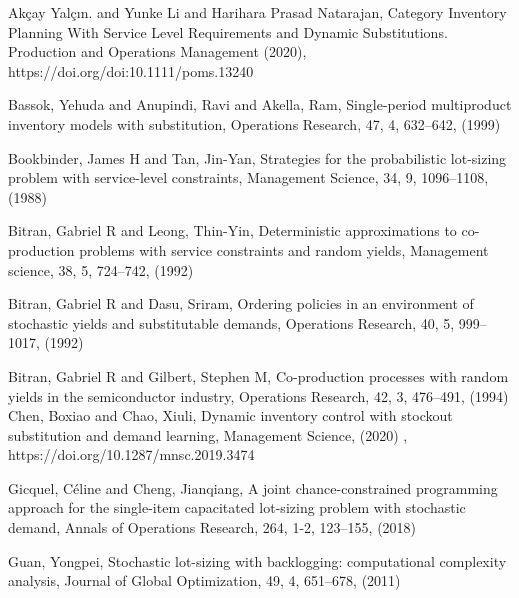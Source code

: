 \documentclass[10pt]{article}
\begin{document}
\begin{thebibliography}{99}







Akçay Yalçın. and Yunke Li and Harihara Prasad Natarajan, Category Inventory Planning With
Service Level Requirements and Dynamic Substitutions.
Production and Operations Management (2020), https://doi.org/doi:10.1111/poms.13240

Bassok, Yehuda and Anupindi, Ravi and Akella, Ram,
Single-period multiproduct inventory models with substitution, Operations Research, 47, 4, 632--642, (1999)
 

 Bookbinder, James H and Tan, Jin-Yan, Strategies for the probabilistic lot-sizing problem with service-level constraints, Management Science, 34, 9, 1096--1108,
 (1988)


Bitran, Gabriel R and Leong, Thin-Yin, Deterministic approximations to co-production problems with service constraints and random yields, Management science, 38, 5, 724--742, (1992)
  
  
Bitran, Gabriel R and Dasu, Sriram, Ordering policies in an environment of stochastic yields and substitutable demands,
Operations Research,
40, 5,
999--1017, (1992)

Bitran, Gabriel R and Gilbert, Stephen M,
  Co-production processes with random yields in the semiconductor industry, Operations Research, 42, 3, 476--491, (1994)
Chen, Boxiao and Chao, Xiuli, Dynamic inventory control with stockout substitution and demand learning, Management Science, (2020) , https://doi.org/10.1287/mnsc.2019.3474

Gicquel, C{\'e}line and Cheng, Jianqiang, A joint chance-constrained programming approach for the single-item capacitated lot-sizing problem with stochastic demand, Annals of Operations Research, 264, 1-2, 123--155, (2018)

 Guan, Yongpei, Stochastic lot-sizing with backlogging: computational complexity analysis,  Journal of Global Optimization, 49, 4, 651--678, (2011)


\end{thebibliography}
\end{document}
